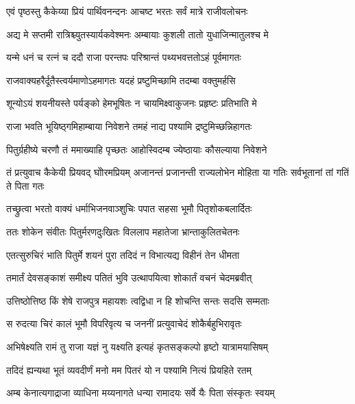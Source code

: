 \twolineshloka
{एवं पृष्ठस्तु कैकेय्या प्रियं पार्थिवनन्दनः}
{आचष्ट भरतः सर्वं मात्रे राजीवलोचनः} %

\twolineshloka
{अद्य मे सप्तमी रात्रिश्च्युतस्यार्यकवेश्मनः}
{अम्बायाः कुशली तातो युधाजिन्मातुलश्च मे} %

\twolineshloka
{यन्मे धनं च रत्नं च ददौ राजा परन्तपः}
{परिश्रान्तं पथ्यभवत्ततोऽहं पूर्वमागतः} %

\twolineshloka
{राजवाक्यहरैर्दूतैस्त्वर्यमाणोऽहमागतः}
{यदहं प्रष्टुमिच्छामि तदम्बा वक्तुमर्हसि} %

\twolineshloka
{शून्योऽयं शयनीयस्ते पर्यङ्को हेमभूषितः}
{न चायमिक्ष्वाकुजनः प्रहृष्टः प्रतिभाति मे} %

\twolineshloka
{राजा भवति भूयिष्ठ्गमिहाम्बाया निवेशने}
{तमहं नाद्य पश्यामि द्रष्टुमिच्छन्निहागतः} %

\twolineshloka
{पितुर्ग्रहीष्ये चरणौ तं ममाख्याहि पृच्छतः}
{आहोस्विदम्ब ज्येष्ठायाः कौसल्याया निवेशने} %

\threelineshloka
{तं प्रत्युवाच कैकेयी प्रियवद् घोोरमप्रियम्}
{अजानन्तं प्रजानन्ती राज्यलोभेन मोहिता}
{या गतिः सर्वभूतानां तां गतिं ते पिता गतः} %

\twolineshloka
{तच्छ्रुत्वा भरतो वाक्यं धर्माभिजनवाञ्शुचिः}
{पपात सहसा भूमौ पितृशोकबलार्दितः} %

\twolineshloka
{ततः शोकेन संवीतः पितुर्मरणदुःखितः}
{विललाप महातेजा भ्रान्ताकुलितचेतनः} %

\twolineshloka
{एतत्सुरुचिरं भाति पितुर्मे शयनं पुरा}
{तदिदं न विभात्यद्य विहीनं तेन धीमता} %

\twolineshloka
{तमार्तं देवसङ्काशं समीक्ष्य पतितं भुवि}
{उत्थापयित्वा शोकार्तं वचनं चेदमब्रवीत्} %

\twolineshloka
{उत्तिष्ठोत्तिष्ठ किं शेषे राजपुत्र महायशः}
{त्वद्विधा न हि शोचन्ति सन्तः सदसि सम्मताः} %

\twolineshloka
{स रुदत्या चिरं कालं भूमौ विपरिवृत्य च}
{जननीं प्रत्युवाचेदं शोकैर्बहुभिरावृतः} %

\twolineshloka
{अभिषेक्ष्यति रामं तु राजा यज्ञं नु यक्ष्यति}
{इत्यहं कृतसङ्कल्पो हृष्टो यात्रामयासिषम्} %

\twolineshloka
{तदिदं ह्यन्यथा भूतं व्यवदीर्णं मनो मम}
{पितरं यो न पश्यामि नित्यं प्रियहिते रतम्} %

\twolineshloka
{अम्ब केनात्यगाद्राजा व्याधिना मय्यनागते}
{धन्या रामादयः सर्वे यैः पिता संस्कृतः स्वयम्} %

